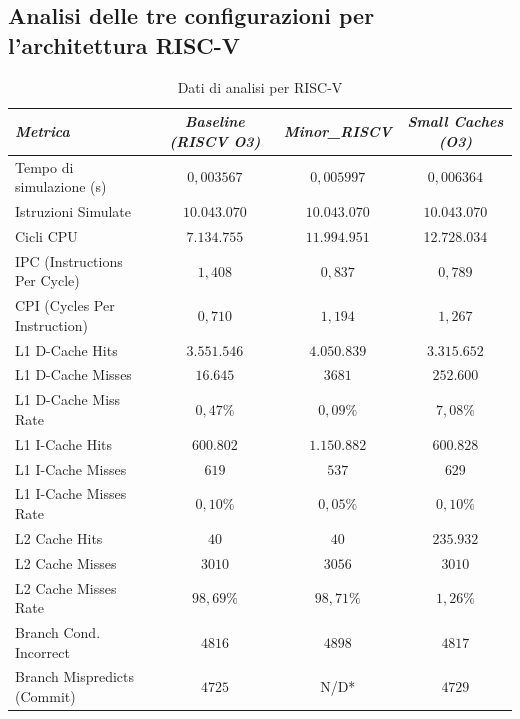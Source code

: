 \documentclass[../../main_document/main.tex]{subfiles}
\begin{document}
\subsection{Analisi delle tre configurazioni per l'architettura RISC-V}
\begin{table}[tbh] %
    \begin{center}
        \begin{tabular}{|l|c|c|c|}
            \hline
            \textit{Metrica} & \textit{Baseline (RISCV O3)} & \textit{Minor\_RISCV} & \textit{Small Caches (O3)}\\
            \hline
            Tempo di simulazione (s) & $0,003567$ & $0,005997$ & 0$,006364$ \\
            Istruzioni Simulate & $10.043.070$ & $10.043.070$ & $10.043.070$ \\
            Cicli CPU & $7.134.755$ & $11.994.951$ & 1$2.728.034$ \\
            IPC (Instructions Per Cycle) & $1,408$ & $0,837$ & $0,789$ \\
            CPI (Cycles Per Instruction) & $0,710$ & $1,194$ & $1,267$ \\
            L1 D-Cache Hits & $3.551.546$ & $4.050.839$ & $3.315.652$ \\
            L1 D-Cache Misses & $16.645$ & $3681$ & $252.600$ \\
            L1 D-Cache Miss Rate & $0,47\%$ & $0,09\%$ & $7,08\%$ \\
            L1 I-Cache Hits & $600.802$ & $1.150.882$ & $600.828$ \\
            L1 I-Cache Misses & $619$ & $537$ & $629$ \\
            L1 I-Cache Misses Rate & $0,10\%$ & $0,05\%$ & $0,10\%$ \\
            L2 Cache Hits & $40$ & $40$ & $235.932$ \\ 
            L2 Cache Misses & $3010$ & $3056$ & $3010$ \\
            L2 Cache Misses Rate & $98,69\%$ & $98,71\%$ & $1,26\%$ \\
            Branch Cond. Incorrect & $4816$ & $4898$ & $4817$ \\
            Branch Mispredicts (Commit) & $4725$ & N/D* & $4729$ \\
            \hline
        \end{tabular}
        \caption{Dati di analisi per RISC-V}
        \label{tab: tab_2}
    \end{center}
\end{table}
\noindent
\end{document}
